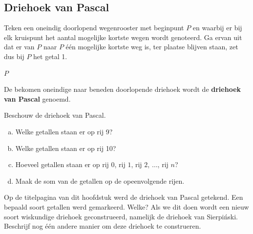 \documentclass[12pt,twoside]{article}
\begin{document}
\begin{theorie}

\pagebreak
\subsection{Driehoek van Pascal}

Teken een oneindig doorlopend wegenrooster met beginpunt $P$ en waarbij er bij elk kruispunt het aantal mogelijke kortste wegen wordt genoteerd. Ga ervan uit dat er van $P$ naar $P$ één mogelijke kortste weg is, ter plaatse blijven staan, zet dus bij $P$ het getal 1.
\begin{center}
  $P$
\end{center}
\ruitjes{16cm}
\begin{mdframed}
De bekomen oneindige naar beneden doorlopende driehoek wordt de {\bf driehoek van Pascal} genoemd.
\end{mdframed}

\end{theorie}

\begin{oefening}
Beschouw de driehoek van Pascal.
\begin{enumerate}[(a)]
  \item Welke getallen staan er op rij 9?
  \item Welke getallen staan er op rij 10?
  \item Hoeveel getallen staan er op rij $0$, rij $1$, rij $2$, $\ldots$, rij $n$?
  \item Maak de som van de getallen op de opeenvolgende rijen.
\end{enumerate}
\end{oefening}

\begin{oefening}
Op de titelpagina van dit hoofdstuk werd de driehoek van Pascal getekend. Een bepaald soort getallen werd gemarkeerd. Welke? Als we dit doen wordt een nieuw soort wiskundige driehoek geconstrueerd, namelijk de driehoek van Sierpiński. Beschrijf nog één andere manier om deze driehoek te construeren.
\end{oefening}
\end{document}
